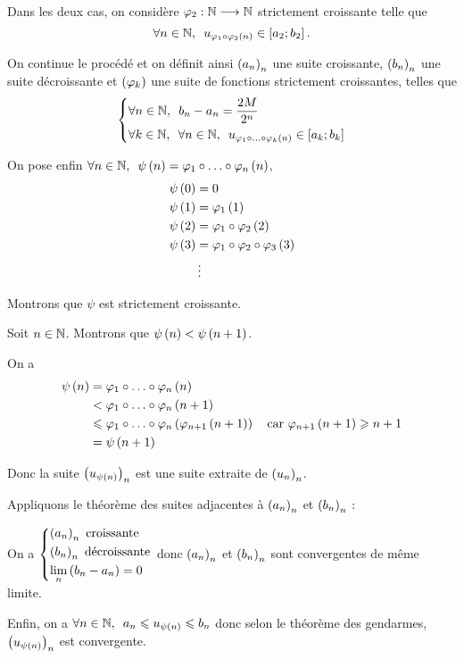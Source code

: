 \begin{dem}
Dans les deux cas, on considère \(\varphi_2:\mathbb{N}\longrightarrow\mathbb{N}\) strictement croissante telle que \[\quantifs{\forall n\in\N}u_{\phi_1\rond\phi_2\paren{n}}\in\intervii{a_2}{b_2}.\]

On continue le procédé et on définit ainsi \(\left(a_n\right)_n\) une suite croissante, \(\left(b_n\right)_n\) une suite décroissante et \(\left(\varphi_k\right)\) une suite de fonctions strictement croissantes, telles que \[\begin{dcases}\quantifs{\forall n\in\N}b_n-a_n=\dfrac{2M}{2^n} \\ \quantifs{\forall k\in\N;\forall n\in\N}u_{\phi_1\rond\dots\rond\phi_k\paren{n}}\in\intervii{a_k}{b_k}\end{dcases}\]

On pose enfin \(\quantifs{\forall n\in\N}\psi\paren{n}=\phi_1\rond\dots\rond\phi_n\paren{n}\), \cad \[\begin{aligned}
\psi\left(0\right)&=0 \\
\psi\left(1\right)&=\varphi_1\left(1\right) \\
\psi\left(2\right)&=\varphi_1\circ\varphi_2\left(2\right) \\
\psi\left(3\right)&=\varphi_1\circ\varphi_2\circ\varphi_3\left(3\right) \\
&\vdots
\end{aligned}\]

Montrons que \(\psi\) est strictement croissante.

Soit \(n\in\mathbb{N}\). Montrons que \(\psi\left(n\right)<\psi\left(n+1\right)\).

On a \[\begin{aligned}
\psi\paren{n}&=\phi_1\rond\dots\rond\phi_n\paren{n} \\
&<\phi_1\rond\dots\rond\phi_n\paren{n+1} \\
&\leq \phi_1\rond\dots\rond\phi_n\paren{\phi_{n+1}\paren{n+1}}\quad\text{car }\phi_{n+1}\paren{n+1}\geq n+1 \\
&=\psi\paren{n+1}
\end{aligned}\]

Donc la suite \(\left(u_{\psi\left(n\right)}\right)_n\) est une suite extraite de \(\left(u_n\right)_n\).

Appliquons le théorème des suites adjacentes à \(\left(a_n\right)_n\) et \(\left(b_n\right)_n\) :

On a \(\begin{dcases}\left(a_n\right)_n\text{ croissante} \\ \left(b_n\right)_n\text{ décroissante} \\ \lim_n\left(b_n-a_n\right)=0\end{dcases}\) donc \(\left(a_n\right)_n\) et \(\left(b_n\right)_n\) sont convergentes de même limite.

Enfin, on a \(\quantifs{\forall n\in\N}a_n\leq u_{\psi\paren{n}}\leq b_n\) donc selon le théorème des gendarmes, \(\left(u_{\psi\left(n\right)}\right)_n\) est convergente.
\end{dem}

